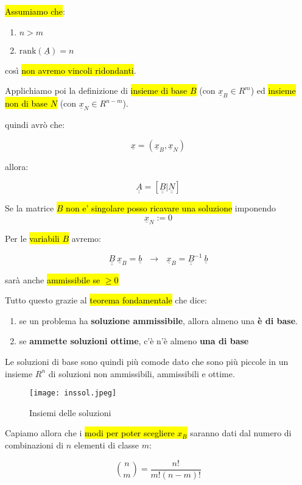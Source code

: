 \hl{Assumiamo che}:

\begin{enumerate}
	\item $n > m$
	\item $\text{rank}(\underline{A}) = n$
\end{enumerate}

così \hl{non avremo vincoli ridondanti}.

Applichiamo poi la definizione di \hl{insieme di base $B$} (con $\underline{x}_B \in R^m$) ed \hl{insieme non di base $N$} (con $\underline{x}_N \in R^{n-m}$).

quindi avrò che:

$$\underline{x} = (\underline{x}_B, \underline{x}_N)$$

allora:

$$\underline{\underline{A}} = [\underline{\underline{B}} | \underline{\underline{N}}]$$

Se la matrice \hl{$B$ non e' singolare posso ricavare una soluzione} imponendo $$\underline{x}_N:=0$$

Per le \hl{variabili $B$} avremo:

$$\underline{\underline{B}}\ \underline{x}_B = \underline{b}\ \ \ \to\ \ \ \underline{x}_B = \underline{\underline{B}}^{-1}\ \underline{b}$$

sarà anche \hl{ammissibile se $\geq 0$}

Tutto questo grazie al \hl{teorema fondamentale} che dice:

\begin{enumerate}
	\item se un problema ha \textbf{soluzione ammissibile}, allora almeno una \textbf{è di base}.
	\item se \textbf{ammette soluzioni ottime}, c'è n'è almeno \textbf{una di base}
\end{enumerate}


Le soluzioni di base sono quindi più comode dato che sono più piccole in un insieme $R^n$ di soluzioni non ammissibili, ammissibili e ottime.


\begin{figure}[H]
\centering
\texttt{[image: inssol.jpeg]}
\caption{Insiemi delle soluzioni} 
\label{inssol}
\end{figure}


Capiamo allora che i \hl{modi per poter scegliere $x_B$} saranno dati dal numero di combinazioni di $n$ elementi di classe $m$:

$$ \binom{n}{m} = \frac{n!}{m!(n-m)!}$$


